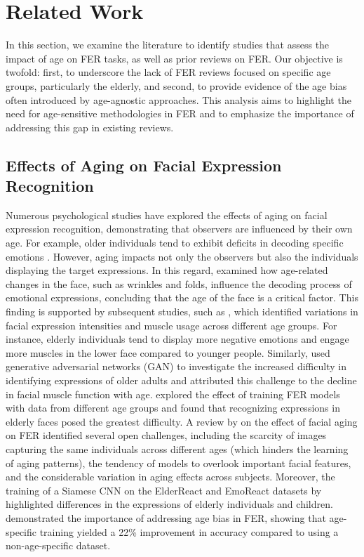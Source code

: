 \section{Related Work}
In this section, we examine the literature to identify studies that assess the impact of age on FER tasks, as well as prior reviews on FER. Our objective is twofold: first, to underscore the lack of FER reviews focused on specific age groups, particularly the elderly, and second, to provide evidence of the age bias often introduced by age-agnostic approaches. This analysis aims to highlight the need for age-sensitive methodologies in FER and to emphasize the importance of addressing this gap in existing reviews.

    \subsection{Effects of Aging on Facial Expression Recognition}

        Numerous psychological studies have explored the effects of aging on facial expression recognition, demonstrating that observers are influenced by their own age. For example, older individuals tend to exhibit deficits in decoding specific emotions \citep{isaacowitz2011bringing, ruffman2008meta}. However, aging impacts not only the observers but also the individuals displaying the target expressions. In this regard, \cite{fölster2014facial} examined how age-related changes in the face, such as wrinkles and folds, influence the decoding process of emotional expressions, concluding that the age of the face is a critical factor. This finding is supported by subsequent studies, such as \cite{ko2021changes}, which identified variations in facial expression intensities and muscle usage across different age groups. For instance, elderly individuals tend to display more negative emotions and engage more muscles in the lower face compared to younger people. Similarly, \cite{ngrondhuis2021having} used generative adversarial networks (GAN) to investigate the increased difficulty in identifying expressions of older adults and attributed this challenge to the decline in facial muscle function with age. \cite{battinisonmez2019computational} explored the effect of training FER models with data from different age groups and found that recognizing expressions in elderly faces posed the greatest difficulty. A review by \cite{raghebatallah2019review} on the effect of facial aging on FER identified several open challenges, including the scarcity of images capturing the same individuals across different ages (which hinders the learning of aging patterns), the tendency of models to overlook important facial features, and the considerable variation in aging effects across subjects. Moreover, the training of a Siamese CNN on the ElderReact and EmoReact datasets by \cite{rahatuljannat2021expression} highlighted differences in the expressions of elderly individuals and children. \cite{park2022facial} demonstrated the importance of addressing age bias in FER, showing that age-specific training yielded a 22\% improvement in accuracy compared to using a non-age-specific dataset.

